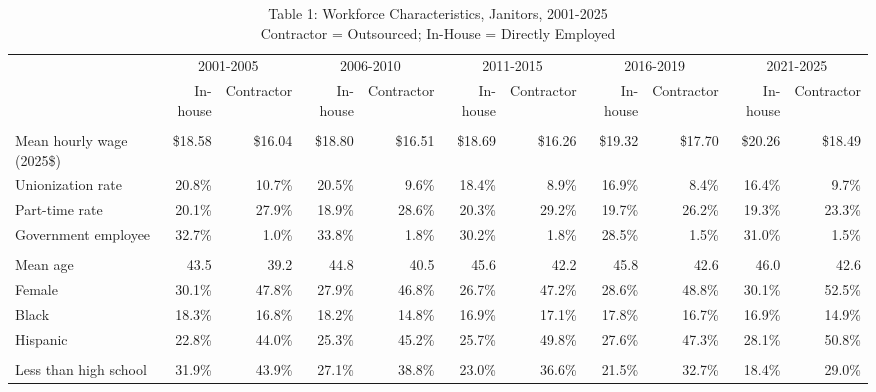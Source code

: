\begin{table}[!t]
\caption*{
{\large Table 1: Workforce Characteristics, Janitors, 2001-2025} \\
{\small Contractor = Outsourced; In-House = Directly Employed}
} 

\fontsize{10.0pt}{12.0pt}\selectfont

\begin{tabular*}{\linewidth}{@{\extracolsep{\fill}}l|rrrrrrrrrr}
\toprule
  & \multicolumn{2}{c}{2001-2005} & \multicolumn{2}{c}{2006-2010} & \multicolumn{2}{c}{2011-2015} & \multicolumn{2}{c}{2016-2019} & \multicolumn{2}{c}{2021-2025} \\ 
\cmidrule(lr){2-3} \cmidrule(lr){4-5} \cmidrule(lr){6-7} \cmidrule(lr){8-9} \cmidrule(lr){10-11}
  & In-house & Contractor & In-house & Contractor & In-house & Contractor & In-house & Contractor & In-house & Contractor \\ 
\midrule\addlinespace[2.5pt]
\multicolumn{11}{l}{Employment and wages} \\[2.5pt] 
\midrule\addlinespace[2.5pt]
Mean hourly wage (2025\$) & \$18.58 & \$16.04 & \$18.80 & \$16.51 & \$18.69 & \$16.26 & \$19.32 & \$17.70 & \$20.26 & \$18.49 \\
Unionization rate & 20.8\% & 10.7\% & 20.5\% & 9.6\% & 18.4\% & 8.9\% & 16.9\% & 8.4\% & 16.4\% & 9.7\% \\
Part-time rate & 20.1\% & 27.9\% & 18.9\% & 28.6\% & 20.3\% & 29.2\% & 19.7\% & 26.2\% & 19.3\% & 23.3\% \\
Government employee & 32.7\% & 1.0\% & 33.8\% & 1.8\% & 30.2\% & 1.8\% & 28.5\% & 1.5\% & 31.0\% & 1.5\% \\
\midrule\addlinespace[2.5pt]
\multicolumn{11}{l}{Demographics} \\[2.5pt] 
\midrule\addlinespace[2.5pt]
Mean age & 43.5 & 39.2 & 44.8 & 40.5 & 45.6 & 42.2 & 45.8 & 42.6 & 46.0 & 42.6 \\
Female & 30.1\% & 47.8\% & 27.9\% & 46.8\% & 26.7\% & 47.2\% & 28.6\% & 48.8\% & 30.1\% & 52.5\% \\
Black & 18.3\% & 16.8\% & 18.2\% & 14.8\% & 16.9\% & 17.1\% & 17.8\% & 16.7\% & 16.9\% & 14.9\% \\
Hispanic & 22.8\% & 44.0\% & 25.3\% & 45.2\% & 25.7\% & 49.8\% & 27.6\% & 47.3\% & 28.1\% & 50.8\% \\
\midrule\addlinespace[2.5pt]
\multicolumn{11}{l}{Education} \\[2.5pt] 
\midrule\addlinespace[2.5pt]
Less than high school & 31.9\% & 43.9\% & 27.1\% & 38.8\% & 23.0\% & 36.6\% & 21.5\% & 32.7\% & 18.4\% & 29.0\% \\

\end{tabular*}
\end{table}
